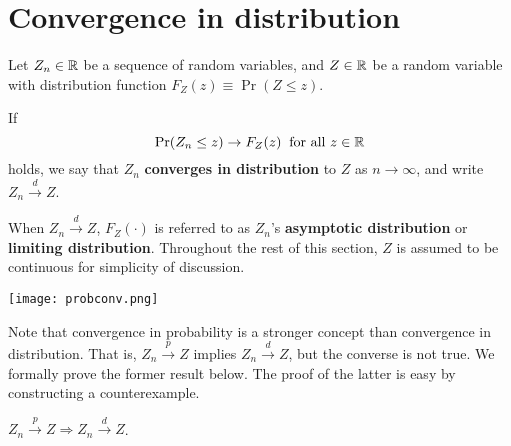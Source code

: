 \documentclass[11pt, A4paper, openany, uplatex]{book}
\begin{document}
\section{Convergence in distribution}\label{subsec:indist}

Let $Z_n \in \mathbb{R}$ be a  sequence of random variables, and $Z \in \mathbb{R}$ be a random variable with distribution function  $F_Z(z) \equiv \Pr(Z \le z)$.
\begin{definition}
If
\[
	\Pr(Z_n \le z) \to F_Z(z) \;\; \text{for all $z \in \mathbb{R}$}
\]
holds, we say that $Z_n$ \textbf{converges in distribution} to $Z$ as $n \to \infty$, and write $Z_n \overset{d}{\to} Z$.
\end{definition}
When $Z_n \overset{d}{\to} Z$, $F_Z(\cdot)$ is referred to as $Z_n$'s \textbf{asymptotic distribution} or \textbf{limiting distribution}.
Throughout the rest of this section, $Z$ is assumed to be continuous for simplicity of discussion.

\begin{center}
		\texttt{[image: probconv.png]}
\end{center}


Note that convergence in probability is a stronger concept than convergence in distribution.
That is, $Z_n \overset{p}{\to} Z$ implies $Z_n \overset{d}{\to} Z$, but the converse is not true.
We formally prove the former result below.
The proof of the latter is easy by constructing a counterexample.
\begin{lemma}\label{lem:p_to_d}
	$Z_n \overset{p}{\to} Z \Longrightarrow Z_n \overset{d}{\to} Z$.
\end{lemma}
\end{document}
